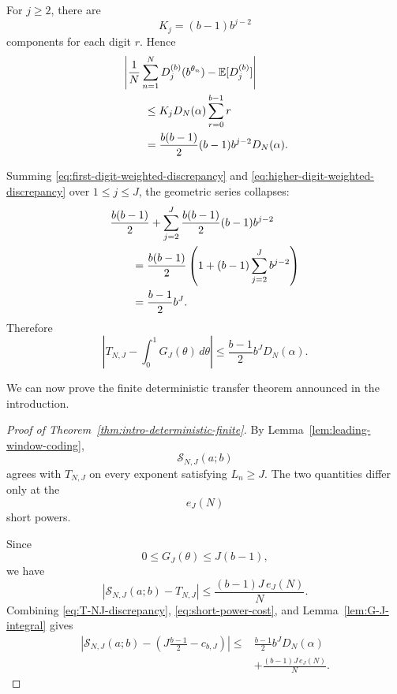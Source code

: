 \documentclass[11pt]{article}
\theoremstyle{definition}
\theoremstyle{remark}
\begin{document}
For \(j\ge2\), there are
\[
    K_j=(b-1)b^{j-2}
\]
components for each digit \(r\).  Hence
\begin{align}
    &\left|
        \frac1N\sum_{n=1}^{N}
        D_j^{(b)}(b^{\theta_n})
        -
        \mathbb E[D_j^{(b)}]
    \right|
    \notag\\
    &\qquad\le
    K_jD_N(\alpha)
    \sum_{r=0}^{b-1}r
    \notag\\
    &\qquad=
    \frac{b(b-1)}{2}
    (b-1)b^{j-2}
    D_N(\alpha).
    \label{eq:higher-digit-weighted-discrepancy}
\end{align}

Summing
\eqref{eq:first-digit-weighted-discrepancy}
and
\eqref{eq:higher-digit-weighted-discrepancy}
over \(1\le j\le J\), the geometric series collapses:
\begin{align}
    &\frac{b(b-1)}2
    +
    \sum_{j=2}^{J}
    \frac{b(b-1)}2
    (b-1)b^{j-2}
    \notag\\
    &\qquad=
    \frac{b(b-1)}2
    \left(
        1+
        (b-1)\sum_{j=2}^{J}b^{j-2}
    \right)
    \notag\\
    &\qquad=
    \frac{b-1}{2}b^J.
    \label{eq:weighted-component-total}
\end{align}
Therefore
\begin{equation}
    \left|
        T_{N,J}
        -
        \int_0^1G_J(\theta)\,d\theta
    \right|
    \le
    \frac{b-1}{2}
    b^J D_N(\alpha).
    \label{eq:T-NJ-discrepancy}
\end{equation}

We can now prove the finite deterministic transfer theorem announced
in the introduction.

\begin{proof}[Proof of
Theorem~\ref{thm:intro-deterministic-finite}]
By
Lemma~\ref{lem:leading-window-coding},
\[
    \mathcal S_{N,J}(a;b)
\]
agrees with \(T_{N,J}\) on every exponent satisfying \(L_n\ge J\).
The two quantities differ only at the
\[
    e_J(N)
\]
short powers.

Since
\[
    0\le G_J(\theta)\le J(b-1),
\]
we have
\begin{equation}
    \left|
        \mathcal S_{N,J}(a;b)-T_{N,J}
    \right|
    \le
    \frac{(b-1)J\,e_J(N)}{N}.
    \label{eq:short-power-cost}
\end{equation}
Combining
\eqref{eq:T-NJ-discrepancy},
\eqref{eq:short-power-cost}, and
Lemma~\ref{lem:G-J-integral} gives
\[
\boxed{
\begin{aligned}
    \left|
        \mathcal S_{N,J}(a;b)
        -
        \left(
            J\frac{b-1}{2}-c_{b,J}
        \right)
    \right|
    \le{}&
    \frac{b-1}{2}
    b^JD_N(\alpha)
    \\
    &+
    \frac{(b-1)J\,e_J(N)}{N}.
\end{aligned}
}
\]
\end{proof}
\end{document}
